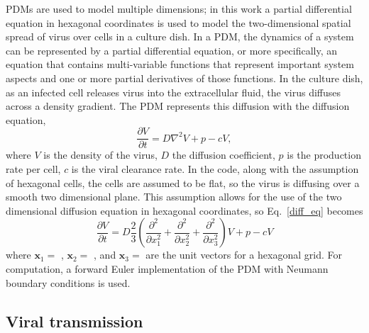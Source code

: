 PDMs are used to model multiple dimensions; in this work a partial differential equation in hexagonal coordinates is used to model the two-dimensional spatial spread of virus over cells in a culture dish. In a PDM, the dynamics of a system can be represented by a partial differential equation, or more specifically, an equation that contains multi-variable functions that represent important system aspects and one or more partial derivatives of those functions. In the culture dish, as an infected cell releases virus into the extracellular fluid, the virus diffuses across a density gradient. The PDM represents this diffusion with the diffusion equation, 
\begin{equation}
\frac{\partial V}{\partial t}=D \nabla^{2}V + p - cV, \label{diff_eq}
\end{equation}
where $V$ is the density of the virus, $D$ the diffusion coefficient, $p$ is the production rate per cell, $c$ is the viral clearance rate. In the code, along with the assumption of hexagonal cells, the cells are assumed to be flat, so the virus is diffusing over a smooth two dimensional plane. This assumption allows for the use of the two dimensional diffusion equation in hexagonal coordinates, so Eq.\ \eqref{diff_eq} becomes 
$$\frac{\partial V}{\partial t} = D\frac{2}{3} \left (\frac{\partial^2}{\partial x^2_1}+\frac{\partial^2}{\partial x^2_2}+\frac{\partial^2}{\partial x^2_3}\right )V + p -cV$$ 
where  
$\textbf{x}_1=$
\scalebox{0.8}{%
$\left [
    \begin{array}{c}
        1 \\
        0 \\
    \end{array}
\right ]$}, 
$\textbf{x}_2=$
, and 
$\textbf{x}_3=$
are the unit vectors for a hexagonal grid. For computation, a forward Euler implementation of the PDM with Neumann boundary conditions is used.

\subsection{Viral transmission} \label{Viral_transmission}

